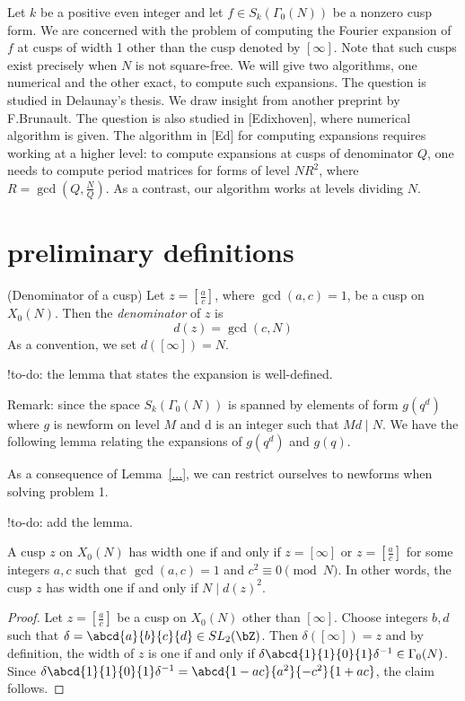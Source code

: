 \documentclass [11pt, proquest] {uwthesis}[2015/03/03]
\begin{document}
Let $k$ be a positive even integer and let $f \in S_k(\Gamma_0(N))$ be a nonzero cusp form.
We are concerned with the problem of computing the Fourier expansion of $f$ at cusps of width 1
other than the cusp denoted by $[\infty]$. Note that such cusps exist precisely when $N$ is 
not square-free. We will give two algorithms, one numerical and the other exact, to compute such
expansions. The question is studied in Delaunay's thesis. We draw insight from another preprint by 
F.Brunault. The question is also studied in [Edixhoven], where numerical algorithm is given. The algorithm 
in [Ed] for computing expansions requires working at a higher level: to compute expansions at cusps of denominator $Q$, one needs to compute period matrices for forms of level $NR^2$, where 
$R = \gcd(Q, \frac{N}{Q})$. As a contrast, our algorithm works at levels dividing $N$. 

\section{preliminary definitions}

\begin{Definition}(Denominator of a cusp)
 Let $z = \left[ \frac{a}{c} \right]$, where $\gcd(a,c) = 1$, be a cusp on $X_0(N)$. Then the {\it denominator} of $z$ is 
\[
	d(z)  = \gcd(c,N)
\] 
As a convention, we set $d([\infty]) = N$. 
\end{Definition}

!to-do: the lemma that states the expansion is well-defined. 

Remark: since the space $S_k(\Gamma_0(N))$ is spanned by elements of form $g(q^d)$ where $g$ is newform on level $M$ and d is an integer such that $Md \mid N$. We have the following lemma relating the expansions of $g(q^d)$ and $g(q)$. 

As a consequence of Lemma~\ref{...}, we can restrict ourselves to newforms when solving problem 1. 

!to-do: add the lemma. 

\begin{Lemma}
A cusp $z$ on $X_0(N)$ has width one if and only if $z = [\infty]$ or $z = [\frac{a}{c}]$ for some integers $a,c$ such that
$\gcd(a,c) = 1$ and $c^2 \equiv 0 \pmod{N}$. In other words, the cusp $z$ has width one if and only if $N \mid d(z)^2$.
\end{Lemma}

\begin{proof}
Let $z = [\frac{a}{c}]$ be a cusp on $X_0(N)$ other than $[\infty]$. Choose integers $b,d$ such that $\delta =  \abcd{a}{b}{c}{d} \in SL_2(\bZ)$. Then $\delta([\infty]) = z$ and by definition, the width of $z$ is one if and only if $\delta \abcd{1}{1}{0}{1} \delta^{-1} \in \Gamma_0(N)$. Since $\delta \abcd{1}{1}{0}{1} \delta^{-1} = \abcd{1-ac}{a^2}{-c^2}{1+ac}$, the claim follows. 
\end{proof}
\end{document}
